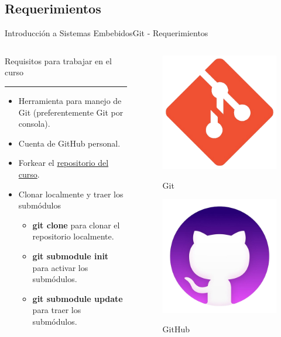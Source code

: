 \documentclass[aspectratio=169, xcolor=dvipsnames]{beamer}
\begin{document}
\subsection{Requerimientos}
\begin{frame}{Introducción a Sistemas Embebidos}{Git - Requerimientos}
\begin{columns}
\begin{column}{.65\textwidth}
    Requisitos para trabajar en el curso
    \noindent\rule{\textwidth}{0.75pt}
    \begin{itemize}
        \item Herramienta para manejo de Git (preferentemente Git por consola).
        \item Cuenta de GitHub personal.
        \item Forkear el \textcolor{myblue}{\href{https://github.com/utn-fra-lse/curso-lse}{repositorio del curso}}.
        \item Clonar localmente y traer los submódulos
        \begin{itemize}
            \item \textbf{git clone} para clonar el repositorio localmente.
            \item \textbf{git submodule init} para activar los submódulos.
            \item \textbf{git submodule update} para traer los submódulos.
        \end{itemize}
    \end{itemize}
\end{column}
\begin{column}{.35\textwidth}
\begin{figure}
    \centering
    \href{https://git-scm.com/}{\includegraphics[width=0.2\linewidth]{resources/images/git_logo.png}}
    \caption{Git}
\end{figure}
\begin{figure}
    \centering
    \href{https://github.com}{\includegraphics[width=0.2\linewidth]{resources/images/github_logo.png}}
    \caption{GitHub}
\end{figure}
\end{column}
\end{columns}
\end{frame}
\end{document}

